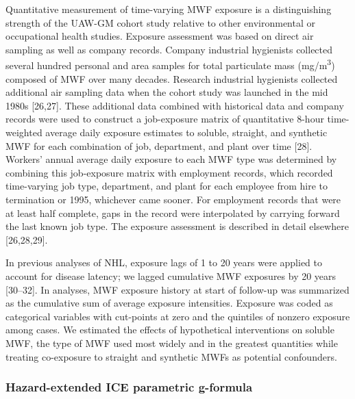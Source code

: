 \documentclass[
  11pt,
  letterpaper,
  DIV=11,
  numbers=noendperiod]{scrartcl}
\begin{document}
Quantitative measurement of time-varying MWF exposure is a
distinguishing strength of the UAW-GM cohort study relative to other
environmental or occupational health studies. Exposure assessment was
based on direct air sampling as well as company records. Company
industrial hygienists collected several hundred personal and area
samples for total particulate mass (mg/m\textsuperscript{3}) composed of
MWF over many decades. Research industrial hygienists collected
additional air sampling data when the cohort study was launched in the
mid 1980s {[}26,27{]}. These additional data combined with historical
data and company records were used to construct a job-exposure matrix of
quantitative 8-hour time-weighted average daily exposure estimates to
soluble, straight, and synthetic MWF for each combination of job,
department, and plant over time {[}28{]}. Workers' annual average daily
exposure to each MWF type was determined by combining this job-exposure
matrix with employment records, which recorded time-varying job type,
department, and plant for each employee from hire to termination or
1995, whichever came sooner. For employment records that were at least
half complete, gaps in the record were interpolated by carrying forward
the last known job type. The exposure assessment is described in detail
elsewhere {[}26,28,29{]}.

In previous analyses of NHL, exposure lags of 1 to 20 years were applied
to account for disease latency; we lagged cumulative MWF exposures by 20
years {[}30--32{]}. In analyses, MWF exposure history at start of
follow-up was summarized as the cumulative sum of average exposure
intensities. Exposure was coded as categorical variables with cut-points
at zero and the quintiles of nonzero exposure among cases. We estimated
the effects of hypothetical interventions on soluble MWF, the type of
MWF used most widely and in the greatest quantities while treating
co-exposure to straight and synthetic MWFs as potential confounders.

\subsubsection{Hazard-extended ICE parametric
g-formula}\label{hazard-extended-ice-parametric-g-formula}
\end{document}
